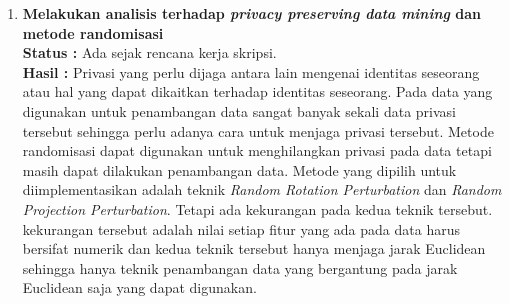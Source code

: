 \documentclass[a4paper,twoside]{article}
\begin{document}
\begin{enumerate}
		\item \textbf{Melakukan analisis terhadap \textit{privacy preserving data mining} dan metode randomisasi}\\
		{\bf Status :} Ada sejak rencana kerja skripsi.\\
		{\bf Hasil :} Privasi yang perlu dijaga antara lain mengenai identitas seseorang atau hal yang dapat dikaitkan terhadap identitas seseorang. Pada data yang digunakan untuk penambangan data sangat banyak sekali data privasi tersebut sehingga perlu adanya cara untuk menjaga privasi tersebut. Metode randomisasi dapat digunakan untuk menghilangkan privasi pada data tetapi masih dapat dilakukan penambangan data. Metode yang dipilih untuk diimplementasikan adalah teknik \textit{Random Rotation Perturbation} dan  \textit{Random Projection Perturbation}. Tetapi ada kekurangan pada kedua teknik tersebut. kekurangan tersebut adalah nilai setiap fitur yang ada pada data harus bersifat numerik dan kedua teknik tersebut hanya menjaga jarak Euclidean sehingga hanya teknik penambangan data yang bergantung pada jarak Euclidean saja yang dapat digunakan.


\end{enumerate}
\end{document}
